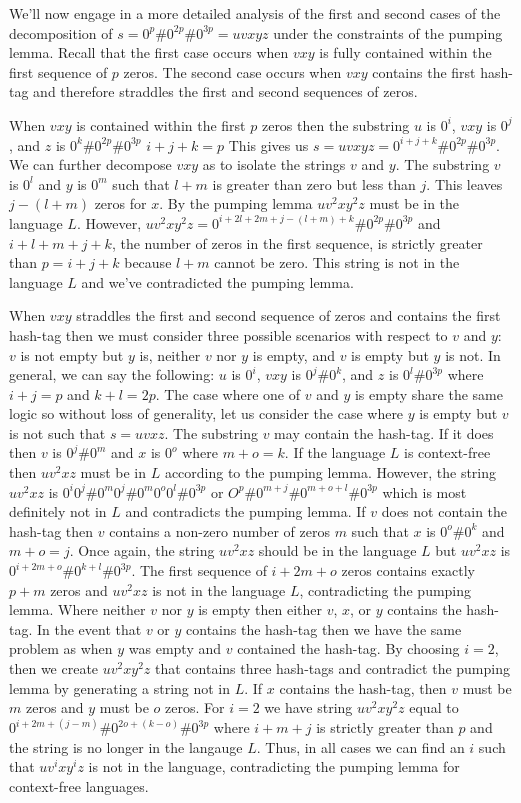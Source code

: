 \documentclass[10pt]{article}
\theoremstyle{definition}
\begin{document}
We'll now engage in a more detailed analysis of the first and second cases of the decomposition of $s = 0^p\#0^{2p}\#0^{3p} = uvxyz$ under the constraints of the pumping lemma. Recall that the first case occurs when $vxy$ is fully contained within the first sequence of $p$ zeros. The second case occurs when $vxy$ contains the first hash-tag and therefore straddles the first and second sequences of zeros.

When $vxy$ is contained within the first $p$ zeros then the substring $u$ is $0^i$, $vxy$ is $0^j$, and $z$ is $0^k\# 0^{2p}\# 0^{3p}$ $i+j+k=p$ This gives us $s = uvxyz = 0^{i+j+k}\# 0^{2p}\# 0^{3p}$. We can further decompose $vxy$ as to isolate the strings $v$ and $y$. The substring $v$ is $0^l$ and $y$ is $0^m$ such that $l+m$ is greater than zero but less than $j$. This leaves $j-(l+m)$ zeros for $x$. By the pumping lemma $uv^2xy^2z$ must be in the language $L$. However, $uv^2xy^2z = 0^{i+2l+2m+j-(l+m)+k} \# 0^{2p} \# 0^{3p}$ and $i+l+m+j+k$, the number of zeros in the first sequence, is strictly greater than $p=i+j+k$ because $l+m$ cannot be zero. This string is not in the language $L$ and we've contradicted the pumping lemma.

When $vxy$ straddles the first and second sequence of zeros and contains the first hash-tag then we must consider three possible scenarios with respect to $v$ and $y$: $v$ is not empty but $y$ is, neither $v$ nor $y$ is empty, and $v$ is empty but $y$ is not. In general, we can say the following: $u$ is $0^i$, $vxy$ is $0^j \# 0^k$, and $z$ is $0^{l} \# 0^{3p}$ where $i+j=p$ and $k+l = 2p$. The case where one of $v$ and $y$ is empty share the same logic so without loss of generality, let us consider the case where $y$ is empty but $v$ is not such that $s = uvxz$. The substring $v$ may contain the hash-tag. If it does then $v$ is $0^j \# 0^m$ and $x$ is $0^o$ where $m+o=k$. If the language $L$ is context-free then $uv^2xz$ must be in $L$ according to the pumping lemma. However, the string $uv^2xz$ is $0^i0^j \# 0^m0^j \# 0^m0^o0^l \# 0^{3p}$ or $O^{p} \# 0^{m+j} \# 0^{m+o+l} \# 0^{3p}$ which is most definitely not in $L$ and contradicts the pumping lemma. If $v$ does not contain the hash-tag then $v$ contains a non-zero number of zeros $m$ such that $x$ is $0^o\#0^k$ and $m+o = j$. Once again, the string $uv^2xz$ should be in the language $L$ but $uv^2xz$ is $0^{i+2m+o}\#0^{k+l}\#0^{3p}$. The first sequence of $i+2m+o$ zeros contains exactly $p+m$ zeros and $uv^2xz$ is not in the language $L$, contradicting the pumping lemma. Where neither $v$ nor $y$ is empty then either $v$, $x$, or $y$ contains the hash-tag. In the event that $v$ or $y$ contains the hash-tag then we have the same problem as when $y$ was empty and $v$ contained the hash-tag. By choosing $i=2$, then we create $uv^2xy^2z$ that contains three hash-tags and contradict the pumping lemma by generating a string not in $L$. If $x$ contains the hash-tag, then $v$ must be $m$ zeros and $y$ must be $o$ zeros. For $i=2$ we have string $uv^2xy^2z$ equal to $0^{i+2m+(j-m)} \# 0^{2o+(k-o)} \# 0^{3p}$ where $i+m+j$ is strictly greater than $p$ and the string is no longer in the langauge $L$. Thus, in all cases we can find an $i$ such that $uv^{i}xy^{i}z$ is not in the language, contradicting the pumping lemma for context-free languages.
\end{document}
